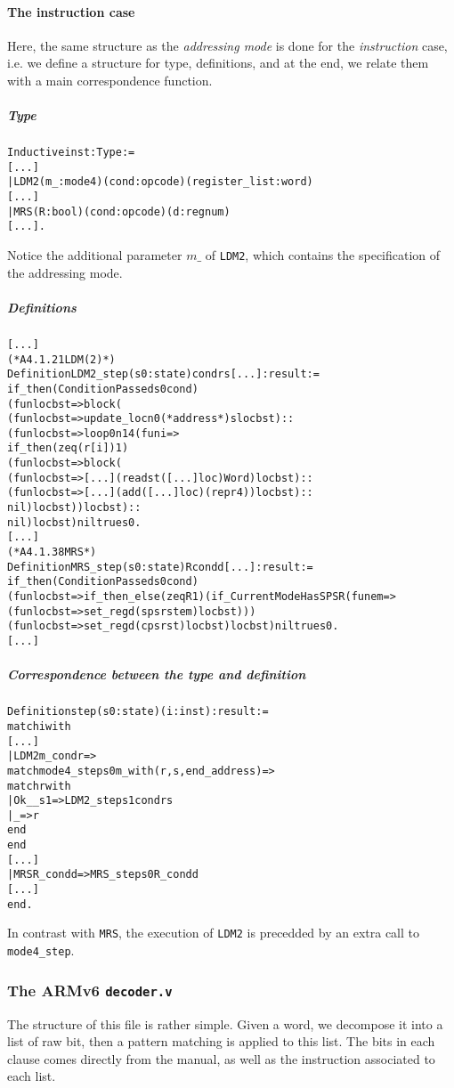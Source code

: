 \documentclass[a4paper, 11pt]{article}
\newenvironment{coq}
  {%
   \begin{alltt}} %% 8.3pl1 (January 2011)
  {\end{alltt} %
  }
\begin{document}
\paragraph{The instruction case}
Here, the same structure as the \emph{addressing mode} is done for the \emph{instruction} case, i.e. we define a structure for type, definitions, and at the end, we relate them with a main correspondence function.
  \subparagraph{Type}
\begin{coq}
Inductive inst : Type := 
[...]
  | LDM2 (m_ : mode4) (cond : opcode) (register_list : word) 
[...]
  | MRS (R : bool) (cond : opcode) (d : regnum) 
[...].
\end{coq}
Notice the additional parameter $m\_$ of {\tt LDM2}, which contains the specification of the addressing mode.
  \subparagraph{Definitions}
\begin{coq}
[...]
(* A4.1.21 LDM (2) *)
Definition LDM2_step (s0 : state) cond r s [...] : result :=
  if_then (ConditionPassed s0 cond)
    (fun loc b st => block (
      (fun loc b st => update_loc n0 (*address*) s loc b st) ::
      (fun loc b st => loop 0 n14 (fun i => 
        if_then (zeq (r[i]) 1)
          (fun loc b st => block (
            (fun loc b st => [...] (read st ([...] loc) Word) loc b st) ::
            (fun loc b st => [...] (add ([...] loc) (repr 4)) loc b st) ::
            nil) loc b st)) loc b st) ::
      nil) loc b st) nil true s0.
[...]
(* A4.1.38 MRS *)
Definition MRS_step (s0 : state) R cond d [...] : result :=
  if_then (ConditionPassed s0 cond)
    (fun loc b st => if_then_else (zeq R 1) (if_CurrentModeHasSPSR (fun em =>
      (fun loc b st => set_reg d (spsr st em) loc b st)))
      (fun loc b st => set_reg d (cpsr st) loc b st) loc b st) nil true s0.
[...]
\end{coq}
  \subparagraph{Correspondence between the type and definition}
\begin{coq}
Definition step (s0 : state) (i : inst) : result :=
  match i with
[...]
    | LDM2 m_ cond r =>
      match mode4_step s0 m_ with (r, s, end_address) =>
        match r with
          | Ok _ _ s1 => LDM2_step s1 cond r s
          | _ => r
        end
      end
[...]
    | MRS R_ cond d => MRS_step s0 R_ cond d
[...]
  end.
\end{coq}
In contrast with {\tt MRS}, the execution of {\tt LDM2} is precedded by an extra call to {\tt mode4\_step}.
\subsubsection{The ARMv6 {\tt decoder.v}}
The structure of this file is rather simple. Given a word, we decompose it into a list of raw bit, then a pattern matching is applied to this list. The bits in each clause comes directly from the manual, as well as the instruction associated to each list.
\end{document}
